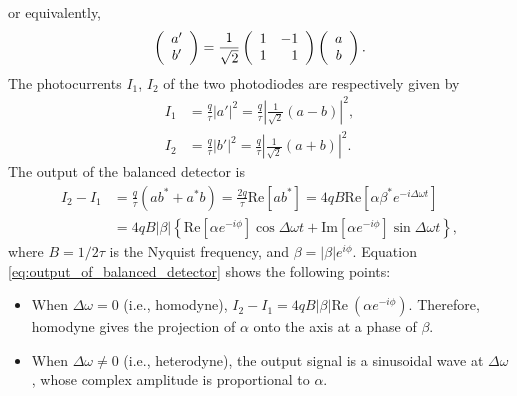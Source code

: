 \documentclass{book}
\begin{document}
or equivalently,
\begin{equation}
  \left( \begin{array}{c}
  	a' \\ b'
  \end{array}
  \right) =
  \frac{1}{\sqrt 2}\left( \begin{array}{r r} 
  	1 & -1 \\ 1 & 1
 \end{array}
	\right)
	\left( \begin{array}{c}
		a \\ b
	\end{array} \right).
	\label{eq:beamsplitter_matrix}
\end{equation}
The photocurrents $I_1$, $I_2$ of the two photodiodes are respectively given by
\begin{equation}
\begin{aligned}
  I_1 &= \frac q \tau |a'|^2 = \frac{q}{\tau}\left|\frac{1}{\sqrt 2} (a - b)\right|^2,\\
  I_2 &= \frac q \tau |b'|^2 = \frac{q}{\tau}\left|\frac{1}{\sqrt 2} (a + b)\right|^2.
\end{aligned}
\end{equation}
The output of the balanced detector is
\begin{equation}
\begin{aligned}
  I_2 - I_1 &= \frac{q}{\tau}(ab^* + a^* b) = \frac{2q}{\tau}\mathrm{Re}[ab^*] 
  = 4qB\mathrm{Re}[\alpha \beta^* e^{-i\Delta\omega t}]\\
  &= 4qB|\beta|\left\{\mathrm{Re} \left[  \alpha e^{-i\phi}\right] \cos \Delta \omega t  + \mathrm{Im} \left[ \alpha e^{-i\phi}\right] \sin \Delta \omega t\right\},
\end{aligned}\label{eq:output_of_balanced_detector}
\end{equation}
where $B = 1/2\tau$ is the Nyquist frequency, and $\beta = |\beta|e^{i\phi}$.
Equation \ref{eq:output_of_balanced_detector} shows the following points: 
\begin{itemize}
	\item When $\Delta \omega = 0$ (i.e., homodyne), $I_2 - I_1 = 4qB|\beta| \mathrm{Re} \ (\alpha e^{-i\phi})$. Therefore, homodyne gives the projection of $\alpha$ onto the axis at a phase of $\beta$. 
	\item When $\Delta \omega \neq 0$ (i.e., heterodyne), the output signal is a sinusoidal wave at $\Delta \omega$, whose complex amplitude is proportional to $\alpha$.
\end{itemize}
\end{document}
